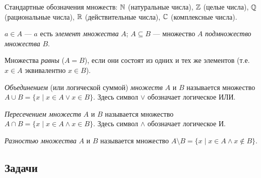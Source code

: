 Стандартные обозначения множеств: $\mathbb N$ (натуральные числа), $\mathbb Z$ (целые числа), $\mathbb Q$ (рациональные числа), $\mathbb R$ (действительные числа), $\mathbb C$ (комплексные числа).

$a\in A$ --- $a$ есть \textit{элемент множества} $A$; $A\subseteq B$ --- множество $A$ \textit{подмножество множества} $B$.

Множества \textit{равны} ($A=B$), если они состоят из одних и тех же элементов (т.е. $x\in A$ эквивалентно $x\in B$).

\textit{Объединением} (или логической суммой) \textit{множеств} $A$ и $B$ называется множество $A\cup B=\{x\mid x\in A\lor x\in B\}$. Здесь символ $\lor$ обозначает логическое ИЛИ. 

\textit{Пересечением множеств} $A$ и $B$ называется множество $A\cap B=\{x\mid x\in A\land x\in B\}$. Здесь символ $\land$ обозначает логическое И.

\textit{Разностью множества} $A$ и $B$ называется множество $A\setminus B=\{x\mid x\in A\land x\notin B\}$.

\subsection*{Задачи}


